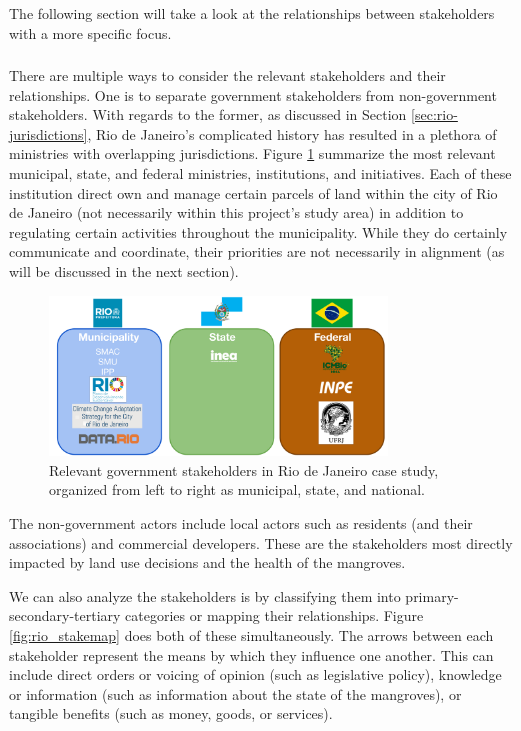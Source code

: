 The following section will take a look at the relationships between stakeholders with a more specific focus.

\subsubsection{}

There are multiple ways to consider the relevant stakeholders and their relationships. One is to separate government stakeholders from non-government stakeholders. With regards to the former, as discussed in Section \ref{sec:rio-jurisdictions}, Rio de Janeiro's complicated history has resulted in a plethora of ministries with overlapping jurisdictions. Figure \ref{fig:government-agencies} summarize the most relevant municipal, state, and federal ministries, institutions, and initiatives. Each of these institution direct own and manage certain parcels of land within the city of Rio de Janeiro (not necessarily within this project's study area) in addition to regulating certain activities throughout the municipality. While they do certainly communicate and coordinate, their priorities are not necessarily in alignment (as will be discussed in the next section). 


\begin{figure}[!htb] 
\centering
\includegraphics[width=0.8\textwidth]{Figures/chap4/government-agencies.png}
\caption[Relevant government stakeholders in Rio de Janeiro case study]{Relevant government stakeholders in Rio de Janeiro case study, organized from left to right as municipal, state, and national.}
\label{fig:government-agencies}
\end{figure}

The non-government actors include local actors such as residents (and their associations) and commercial developers. These are the stakeholders most directly impacted by land use decisions and the health of the mangroves.

We can also analyze the stakeholders is by classifying them into primary-secondary-tertiary categories or mapping their relationships. Figure \ref{fig:rio_stakemap} does both of these simultaneously. The arrows between each stakeholder represent the means by which they influence one another. This can include direct orders or voicing of opinion (such as legislative policy), knowledge or information (such as information about the state of the mangroves), or tangible benefits (such as money, goods, or services).

